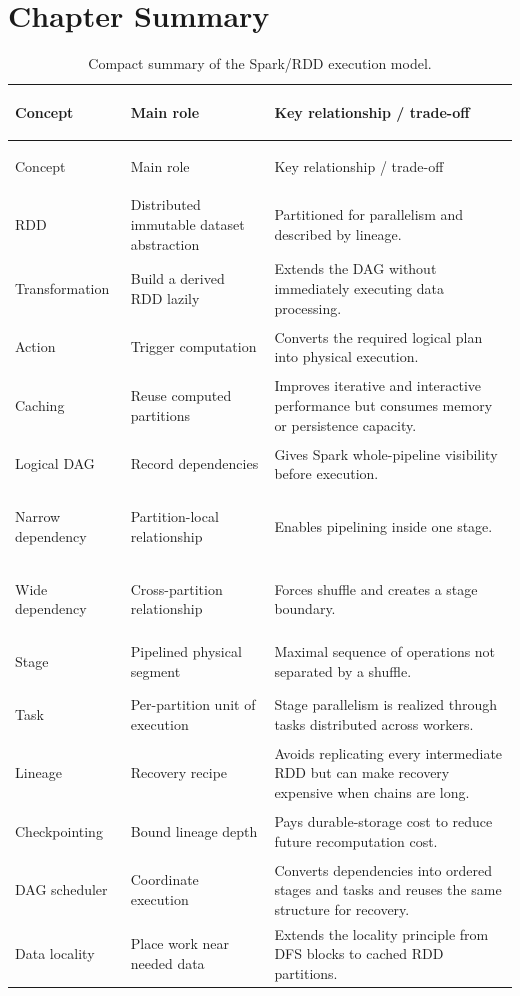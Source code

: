 \documentclass[11pt,a4paper,oneside]{book}
\begin{document}
\section{Chapter Summary}

\begin{longtable}{>{\bfseries\raggedright\arraybackslash}p{} >{\raggedright\arraybackslash}p{} >{\raggedright\arraybackslash}p{}}
\caption{Compact summary of the Spark/RDD execution model.}
\label{tab:spark-core-summary}\\
\toprule
Concept & Main role & Key relationship / trade-off \\
\midrule
\endfirsthead
\toprule
Concept & Main role & Key relationship / trade-off \\
\midrule
\endhead
RDD & Distributed immutable dataset abstraction & Partitioned for parallelism and described by lineage. \\
Transformation & Build a derived RDD lazily & Extends the DAG without immediately executing data processing. \\
Action & Trigger computation & Converts the required logical plan into physical execution. \\
Caching & Reuse computed partitions & Improves iterative and interactive performance but consumes memory or persistence capacity. \\
Logical DAG & Record dependencies & Gives Spark whole-pipeline visibility before execution. \\
Narrow dependency & Partition-local relationship & Enables pipelining inside one stage. \\
Wide dependency & Cross-partition relationship & Forces shuffle and creates a stage boundary. \\
Stage & Pipelined physical segment & Maximal sequence of operations not separated by a shuffle. \\
Task & Per-partition unit of execution & Stage parallelism is realized through tasks distributed across workers. \\
Lineage & Recovery recipe & Avoids replicating every intermediate RDD but can make recovery expensive when chains are long. \\
Checkpointing & Bound lineage depth & Pays durable-storage cost to reduce future recomputation cost. \\
DAG scheduler & Coordinate execution & Converts dependencies into ordered stages and tasks and reuses the same structure for recovery. \\
Data locality & Place work near needed data & Extends the locality principle from DFS blocks to cached RDD partitions. \\
\bottomrule
\end{longtable}
\end{document}
